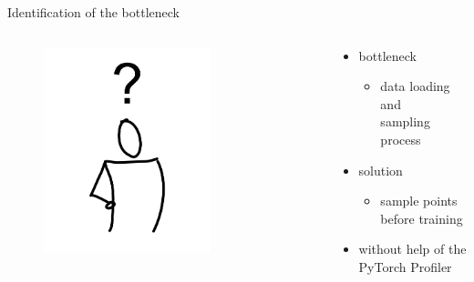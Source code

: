 \documentclass[compress,aspectratio=169]{beamer}
\begin{document}
\begin{frame}{Identification of the bottleneck}

\begin{columns}
        \begin{column}{0.5\textwidth}
            \centering
            \vspace{-1em}
            \begin{figure}
            \includegraphics[width=0.7\textwidth]{./assets/icon_question}
            \end{figure}
        \end{column}
        \begin{column}{0.5\textwidth}
            \begin{itemize}
                \item bottleneck
                \begin{itemize}
                    \item data loading and \\sampling process
                \end{itemize}
                \item solution
                    \begin{itemize}
                        \item sample points before training
                    \end{itemize}
                \vspace{2em}
                \hline
                \vspace{2em}
                \item without help of the PyTorch Profiler
            \end{itemize}
        \end{column}
    \end{columns}

\end{frame}
\end{document}
